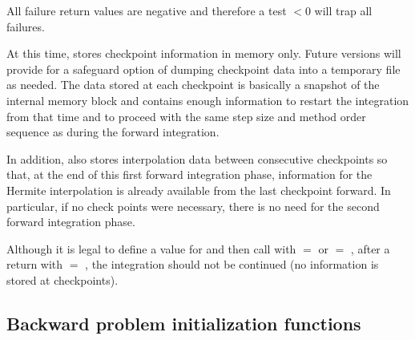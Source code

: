 {
  All failure return values are negative and therefore a test $< 0$
  will trap all  failures.

  At this time,  stores checkpoint information in memory
  only. Future versions will provide for a safeguard option of dumping checkpoint
  data into a temporary file as needed. The data stored at each checkpoint is basically
  a snapshot of the {\cvodes} internal memory block and contains enough information
  to restart the integration from that time and to proceed with the same step size and
  method order sequence as during the forward integration.
  
  In addition,  also stores interpolation data between consecutive checkpoints
  so that, at the end of this first forward integration phase, information for the Hermite 
  interpolation is already available from the last checkpoint forward. In particular,
  if no check points were necessary, there is no need for the second forward integration phase.

  Although it is legal to define a value for  and then call 
  with  $=$  or  $=$ , 
  after a return with  $=$ , the integration should not be 
  continued (no  information is stored at checkpoints).
}  


\subsection{Backward problem initialization functions}\label{sss:cvodemallocb}

